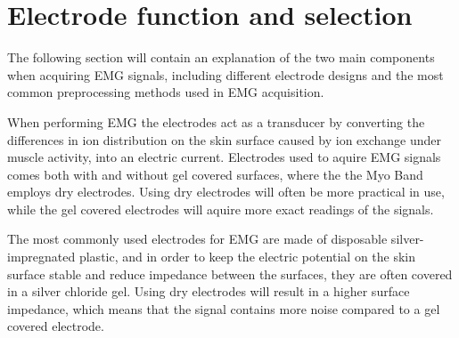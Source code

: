 \section{Electrode function and selection}

The following section will contain an explanation of the two main components when acquiring EMG signals, including different electrode designs and the most common preprocessing methods used in EMG acquisition.

When performing EMG the electrodes act as a transducer by converting the differences in ion distribution on the skin surface caused by ion exchange under muscle activity, into an electric current. Electrodes used to aquire EMG signals comes both with and without gel covered surfaces, where the the Myo Band employs dry electrodes. Using dry electrodes will often be more practical in use, while the gel covered electrodes will aquire more exact readings of the signals. \cite{lee2008 , cram2012}

The most commonly used electrodes for EMG are made of disposable silver-impregnated plastic, and in order to keep the electric potential on the skin surface stable and reduce impedance between the surfaces, they are often covered in a silver chloride gel. Using dry electrodes will result in  a higher surface impedance, which means that the signal contains more noise compared to a gel covered electrode.\cite{cram2012}

